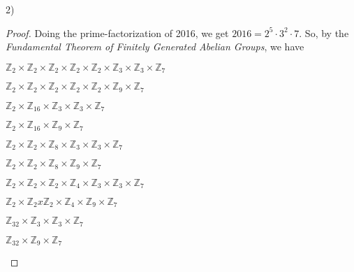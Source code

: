 \documentclass[executivepaper]{article}
\begin{document}
\begin{flushleft}

2)

\begin{proof}

Doing the prime-factorization of 2016, we get $2016=2^5 \cdot 3^2 \cdot 7$. So, by the \textit{Fundamental Theorem of Finitely Generated Abelian Groups}, we have

\begin{center}

$\mathbb{Z}_{2} \times \mathbb{Z}_{2} \times \mathbb{Z}_{2} \times \mathbb{Z}_{2} \times \mathbb{Z}_{2} \times \mathbb{Z}_{3} \times \mathbb{Z}_{3} \times \mathbb{Z}_{7}$

\vspace{2mm}

$\mathbb{Z}_{2} \times \mathbb{Z}_{2} \times \mathbb{Z}_{2} \times \mathbb{Z}_{2} \times \mathbb{Z}_{2} \times \mathbb{Z}_{9} \times \mathbb{Z}_{7}$

\vspace{2mm}

$\mathbb{Z}_{2} \times \mathbb{Z}_{16} \times \mathbb{Z}_{3} \times \mathbb{Z}_{3} \times \mathbb{Z}_{7}$

\vspace{2mm}

$\mathbb{Z}_{2} \times \mathbb{Z}_{16} \times \mathbb{Z}_{9} \times \mathbb{Z}_{7}$

\vspace{2mm}

$\mathbb{Z}_{2} \times \mathbb{Z}_{2} \times \mathbb{Z}_{8} \times \mathbb{Z}_{3} \times \mathbb{Z}_{3} \times \mathbb{Z}_{7}$

\vspace{2mm}

$\mathbb{Z}_{2} \times \mathbb{Z}_{2} \times \mathbb{Z}_{8} \times \mathbb{Z}_{9} \times \mathbb{Z}_{7}$

\vspace{2mm}

$\mathbb{Z}_{2} \times \mathbb{Z}_{2} \times \mathbb{Z}_{2} \times \mathbb{Z}_{4} \times \mathbb{Z}_{3} \times \mathbb{Z}_{3} \times \mathbb{Z}_{7}$

\vspace{2mm}

$\mathbb{Z}_{2} \times \mathbb{Z}_{2} x \mathbb{Z}_{2} \times \mathbb{Z}_{4} \times \mathbb{Z}_{9} \times \mathbb{Z}_{7}$

\vspace{2mm}

$\mathbb{Z}_{32} \times \mathbb{Z}_{3} \times \mathbb{Z}_{3} \times \mathbb{Z}_{7}$

\vspace{2mm}

$\mathbb{Z}_{32} \times \mathbb{Z}_{9} \times \mathbb{Z}_{7}$

\end{center} 

\end{proof}

\end{flushleft}
\end{document}
